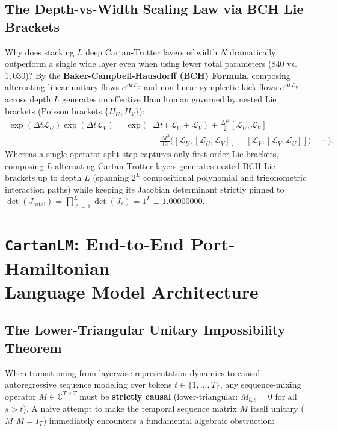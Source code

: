 \documentclass[11pt,a4paper]{article}
\begin{document}
\subsection{The Depth-vs-Width Scaling Law via BCH Lie Brackets}
Why does stacking $L$ deep Cartan-Trotter layers of width $N$ dramatically outperform a single wide layer even when using fewer total parameters ($840$ vs.\ $1,030$)? By the \textbf{Baker-Campbell-Hausdorff (BCH) Formula}, composing alternating linear unitary flows $e^{\Delta t \mathcal{L}_U}$ and non-linear symplectic kick flows $e^{\Delta t \mathcal{L}_V}$ across depth $L$ generates an effective Hamiltonian governed by nested Lie brackets (Poisson brackets $\{H_U, H_V\}$):
\begin{align}
    \exp(\Delta t \mathcal{L}_U)\exp(\Delta t \mathcal{L}_V) = \exp\Big(&\Delta t(\mathcal{L}_U + \mathcal{L}_V) + \frac{\Delta t^2}{2}[\mathcal{L}_U, \mathcal{L}_V] \nonumber \\
    &+ \frac{\Delta t^3}{12}\Big([\mathcal{L}_U, [\mathcal{L}_U, \mathcal{L}_V]] + [\mathcal{L}_V, [\mathcal{L}_V, \mathcal{L}_U]]\Big) + \cdots\Big).
    \label{eq:bch_hierarchy}
\end{align}
Whereas a single operator split step captures only first-order Lie brackets, composing $L$ alternating Cartan-Trotter layers generates nested BCH Lie brackets up to depth $L$ (spanning $2^L$ compositional polynomial and trigonometric interaction paths) while keeping its Jacobian determinant strictly pinned to $\det(J_{\text{total}}) = \prod_{\ell=1}^L \det(J_\ell) = 1^L \equiv 1.00000000$.

\section[\texttt{CartanLM}: End-to-End Port-Hamiltonian LM Architecture]{\texttt{CartanLM}: End-to-End Port-Hamiltonian\\ Language Model Architecture}
\label{sec:cartan_lm}

\subsection{The Lower-Triangular Unitary Impossibility Theorem}
When transitioning from layerwise representation dynamics to causal autoregressive sequence modeling over tokens $t \in \{1,\dots,T\}$, any sequence-mixing operator $M \in \mathbb{C}^{T\times T}$ must be \textbf{strictly causal} (lower-triangular: $M_{t,s} = 0$ for all $s > t$). A naive attempt to make the temporal sequence matrix $M$ itself unitary ($M^\dagger M = I_T$) immediately encounters a fundamental algebraic obstruction:
\end{document}
